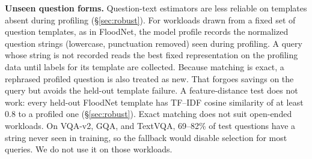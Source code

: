\textbf{Unseen question forms.} Question-text estimators are less reliable on
templates absent during profiling (\S\ref{sec:robust}). For workloads drawn
from a fixed set of question templates, as in FloodNet, the model profile
records the normalized question strings (lowercase, punctuation removed) seen
during profiling. A query whose string is not recorded reads the best fixed
representation on the profiling data until labels for its template are
collected. Because matching is exact, a rephrased profiled question is also
treated as new. That forgoes savings on the query but avoids the held-out
template failure. A feature-distance test does not work: every held-out
FloodNet template has TF--IDF cosine similarity of at least 0.8 to a profiled
one (\S\ref{sec:robust}). Exact matching does not suit open-ended workloads.
On VQA-v2, GQA, and TextVQA, 69--82\% of test questions have a string never
seen in training, so the fallback would disable selection for most queries.
We do not use it on those workloads.
